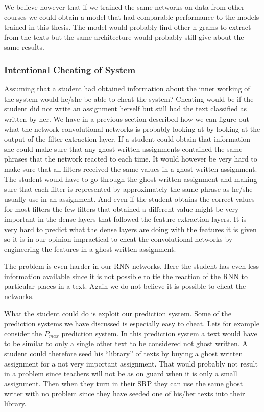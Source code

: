 We believe however that if we trained the same networks on data from other
courses we could obtain a model that had comparable performance to the models
trained in this thesis. The model would probably find other n-grams to extract
from the texts but the same architecture would probably still give about the
same results.


\subsubsection{Intentional Cheating of System}

Assuming that a student had obtained information about the inner working of
the system would he/she be able to cheat the system? Cheating would be if the
student did not write an assignment herself but still had the text classified
as written by her. We have in a previous section described how we can figure
out what the network convolutional networks is probably looking at by looking
at the output of the filter extraction layer. If a student could obtain that
information she could make sure that any ghost written assignments contained
the same phrases that the network reacted to each time. It would however be
very hard to make sure that all filters received the same values in a ghost
written assignment. The student would have to go through the ghost written
assignment and making sure that each filter is represented by approximately the
same phrase as he/she usually use in an assignment. And even if the student
obtains the correct values for most filters the few filters that obtained a
different value might be very important in the dense layers that followed the
feature extraction layers. It is very hard to predict what the dense layers are
doing with the features it is given so it is in our opinion impractical to cheat
the convolutional networks by engineering the features in a ghost written
assignment.

The problem is even harder in our \gls{RNN} networks. Here the student has even
less information available since it is not possible to tie the reaction of the
\gls{RNN} to particular places in a text. Again we do not believe it is possible
to cheat the networks.

What the student could do is exploit our prediction system. Some of the
prediction systems we have discussed is especially easy to cheat. Lets for
example consider the $P_{max}$ prediction system. In this prediction system a
text would have to be similar to only a single other text to be considered not
ghost written. A student could therefore seed his ``library'' of texts by buying
a ghost written assignment for a not very important assignment. That would
probably not result in a problem since teachers will not be as on guard when
it is only a small assignment. Then when they turn in their \gls{SRP} they can
use the same ghost writer with no problem since they have seeded one of his/her
texts into their library.


